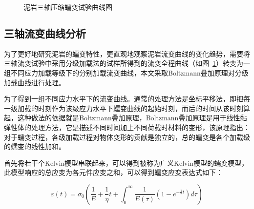 \begin{figure}[ht!]
    \centering
    \centering
    \caption{泥岩三轴压缩蠕变试验曲线图}
    \label{fig:2-11}
\end{figure}


\subsection{三轴流变曲线分析}
为了更好地研究泥岩的蠕变特性，更直观地观察泥岩流变曲线的变化趋势，需要将三轴流变试验中采用分级加载法的试样所得到的流变全程曲线（如图~\ref{fig:2-11}）转变为一组不同应力加载等级下的分别加载流变曲线，本文采取Boltzmann叠加原理对分级加载曲线进行处理。

为了得到一组不同应力水平下的流变曲线。通常的处理方法是坐标平移法，即把每一级加载的时刻作为该级应力水平下蠕变曲线的起始时刻，而后的时间从该时刻算起，这种做法的依据就是Boltzmann叠加原理，Boltzmann叠加原理是用于线性黏弹性体的处理方法，它是描述不同时间加上不同荷载时材料的变形，该原理指出：对于蠕变过程，各级加载过程对物体变形的贡献是独立的，总的蠕变是各个加载级的蠕变的线性加和。

首先将若干个Kelvin模型串联起来，可以得到被称为广义Kelvin模型的蠕变模型，此模型响应的总应变为各元件应变之和，可以得到蠕变应变表达式如下：

\begin{equation}
     {\varepsilon(t)}={\sigma_0}(\frac{1}{E}+\frac{1}{\eta}t+\int_{0}^{\infty} \frac{1}{E(\tau)}(1-e^{-\frac{1}{\tau}t}) d{\tau})
\end{equation}

